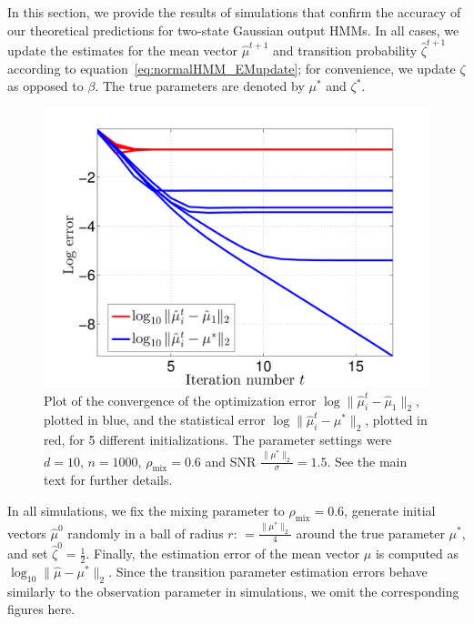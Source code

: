 \documentclass[twoside,11pt]{article}
\newcommand{\mixcoef}{\ensuremath{\rho_{\mathrm{mix}}}}
\newcommand{\paramobs}{\mu}
\newcommand{\trueparamobs}{\ensuremath{\paramobs^*}}
\newcommand{\paramtrans}{\beta}
\newcommand{\defn}{: \, = }
\newcommand{\rad}{\ensuremath{r}}
\newcommand{\probpar}{\zeta}
\newcommand{\matprob}{\probpar}
\newcommand{\matprobhat}{\widehat{\matprob}}
\newcommand{\paramobshat}{\widehat{\paramobs}}
\begin{document}
In this section, we provide the results of simulations that confirm
the accuracy of our theoretical predictions for two-state Gaussian
output HMMs. In all cases, we update the estimates for the mean vector
$\paramobshat^{t+1}$ and transition probability $\hat{\matprob}^{t+1}$
according to equation~\eqref{eq:normalHMM_EMupdate}; for
convenience, we update $\zeta$ as opposed to $\paramtrans$. 
The true parameters are denoted by $\trueparamobs$ and
$\matprob^*$.
\begin{figure}[htbp]
  \begin{center}
\includegraphics[scale = 0.45]{images/OpStatErr_iteration_tofirst_Paper.pdf}
\end{center}
\caption{Plot of the convergence of the optimization error $\log
  \|\widehat{\paramobs}_i^t - \widehat{\paramobs}_1\|_2$,
  plotted in blue, and the statistical error
  $\log\|\widehat{\paramobs}_i^t - \trueparamobs\|_2$, plotted in red,
  for 5 different initializations.  The parameter settings were $d =
  10$, $n = 1000$, $\mixcoef = 0.6$ and SNR
  $\frac{\|\trueparamobs\|_2}{\sigma} = 1.5$.  See the main text for
  further details.}
\label{fig:it}
\end{figure}


In all simulations, we fix the mixing parameter to $\mixcoef =0.6$,
generate initial vectors $\paramobshat^0$ randomly in a ball of radius
$\rad \defn \frac{\|\trueparamobs\|_2}{4}$ around the true parameter
$\trueparamobs$, and set $\widehat{\zeta}^0 = \frac{1}{2}$.  Finally,
the estimation error of the mean vector $\paramobs$ is computed as
$\log_{10}\|\hat{\mu} - \trueparamobs\|_2$. Since the transition
parameter estimation errors behave similarly to the observation
parameter in simulations, we omit the corresponding figures here.
\end{document}
